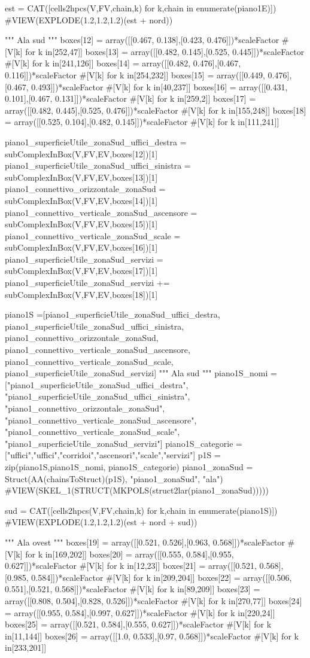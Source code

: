 est = CAT([cells2hpcs(V,FV,chain,k) for k,chain in enumerate(piano1E)])
#VIEW(EXPLODE(1.2,1.2,1.2)(est + nord))

""" Ala sud """
boxes[12] = array([[0.467, 0.138],[0.423, 0.476]])*scaleFactor #[V[k] for k in[252,47]]
boxes[13] = array([[0.482, 0.145],[0.525, 0.445]])*scaleFactor #[V[k] for k in[241,126]]
boxes[14] = array([[0.482, 0.476],[0.467, 0.116]])*scaleFactor #[V[k] for k in[254,232]]
boxes[15] = array([[0.449, 0.476],[0.467, 0.493]])*scaleFactor #[V[k] for k in[40,237]]
boxes[16] = array([[0.431, 0.101],[0.467, 0.131]])*scaleFactor #[V[k] for k in[259,2]]
boxes[17] = array([[0.482, 0.445],[0.525, 0.476]])*scaleFactor #[V[k] for k in[155,248]]
boxes[18] = array([[0.525, 0.104],[0.482, 0.145]])*scaleFactor #[V[k] for k in[111,241]]

piano1_superficieUtile_zonaSud_uffici_destra = subComplexInBox(V,FV,EV,boxes[12])[1]
piano1_superficieUtile_zonaSud_uffici_sinistra = subComplexInBox(V,FV,EV,boxes[13])[1]
piano1_connettivo_orizzontale_zonaSud = subComplexInBox(V,FV,EV,boxes[14])[1]
piano1_connettivo_verticale_zonaSud_ascensore = subComplexInBox(V,FV,EV,boxes[15])[1]
piano1_connettivo_verticale_zonaSud_scale = subComplexInBox(V,FV,EV,boxes[16])[1]
piano1_superficieUtile_zonaSud_servizi = subComplexInBox(V,FV,EV,boxes[17])[1]
piano1_superficieUtile_zonaSud_servizi += subComplexInBox(V,FV,EV,boxes[18])[1]

piano1S =[piano1_superficieUtile_zonaSud_uffici_destra, piano1_superficieUtile_zonaSud_uffici_sinistra, piano1_connettivo_orizzontale_zonaSud, piano1_connettivo_verticale_zonaSud_ascensore, piano1_connettivo_verticale_zonaSud_scale, piano1_superficieUtile_zonaSud_servizi]
""" Ala sud """
piano1S_nomi =["piano1_superficieUtile_zonaSud_uffici_destra", "piano1_superficieUtile_zonaSud_uffici_sinistra", "piano1_connettivo_orizzontale_zonaSud", "piano1_connettivo_verticale_zonaSud_ascensore", "piano1_connettivo_verticale_zonaSud_scale", "piano1_superficieUtile_zonaSud_servizi"]
piano1S_categorie =["uffici","uffici","corridoi","ascensori","scale","servizi"]
p1S = zip(piano1S,piano1S_nomi, piano1S_categorie)
piano1_zonaSud = Struct(AA(chainsToStruct)(p1S), "piano1_zonaSud", "ala")
#VIEW(SKEL_1(STRUCT(MKPOLS(struct2lar(piano1_zonaSud)))))
    
sud = CAT([cells2hpcs(V,FV,chain,k) for k,chain in enumerate(piano1S)])
#VIEW(EXPLODE(1.2,1.2,1.2)(est + nord + sud))

""" Ala ovest """
boxes[19] = array([[0.521, 0.526],[0.963, 0.568]])*scaleFactor #[V[k] for k in[169,202]]
boxes[20] = array([[0.555, 0.584],[0.955, 0.627]])*scaleFactor #[V[k] for k in[12,23]]
boxes[21] = array([[0.521, 0.568],[0.985, 0.584]])*scaleFactor #[V[k] for k in[209,204]]
boxes[22] = array([[0.506, 0.551],[0.521, 0.568]])*scaleFactor #[V[k] for k in[89,209]]
boxes[23] = array([[0.808, 0.504],[0.828, 0.526]])*scaleFactor #[V[k] for k in[270,77]]
boxes[24] = array([[0.955, 0.584],[0.997, 0.627]])*scaleFactor #[V[k] for k in[220,24]]
boxes[25] = array([[0.521, 0.584],[0.555, 0.627]])*scaleFactor #[V[k] for k in[11,144]]
boxes[26] = array([[1.0, 0.533],[0.97, 0.568]])*scaleFactor #[V[k] for k in[233,201]]

